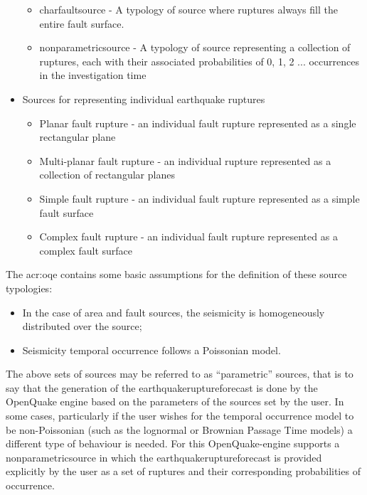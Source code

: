 \begin{itemize}
\begin{itemize}
        \item \Gls{charfaultsource} - A typology of source where ruptures
        always fill the entire fault surface.
        
        \item \Gls{nonparametricsource} - A typology of source representing a collection of ruptures, each with their associated probabilities of 0, 1, 2 ... occurrences in the investigation time

    \end{itemize}

    \item Sources for representing individual earthquake ruptures
    
    \begin{itemize}
        \item Planar fault rupture - an individual fault rupture represented as a single rectangular plane
        \item Multi-planar fault rupture - an individual rupture represented as a collection of rectangular planes
        \item Simple fault rupture - an individual fault rupture represented as a simple fault surface
        \item Complex fault rupture - an individual fault rupture represented as a complex fault surface
    \end{itemize}

\end{itemize}

The \glsdesc{acr:oqe} contains some basic assumptions for the definition of
these source typologies:

\begin{itemize}

    \item In the case of area and fault sources, the seismicity is
    homogeneously distributed over the source;

    \item Seismicity temporal occurrence follows a Poissonian model.

\end{itemize}

The above sets of sources may be referred to as ``parametric'' sources, that is to say that the generation of the \Gls{earthquakeruptureforecast} is done by the OpenQuake engine based on the parameters of the sources set by the user. In some cases, particularly if the user wishes for the temporal occurrence model to be non-Poissonian (such as the lognormal or Brownian Passage Time models) a different type of behaviour is needed. For this OpenQuake-engine supports a \Gls{nonparametricsource} in which the \Gls{earthquakeruptureforecast} is provided explicitly by the user as a set of ruptures and their corresponding probabilities of occurrence.

